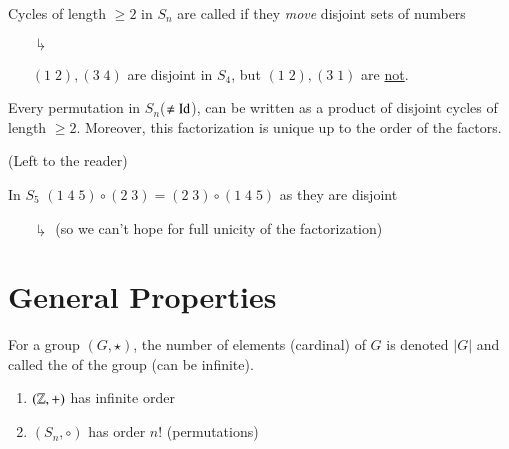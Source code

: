 \documentclass[12pt, a4paper, twoside, openright, titlepage]{book}
\begin{document}
\begin{defn}{}{}
    Cycles of length $\geq 2$ in $S_n$ are called  if they \emph{move} disjoint sets of numbers
    \begin{enumerate}
        \item[$\drsh$] \begin{eg}{}{}
            $(1\;2), (3\;4)$ are disjoint in $S_4$, but $(1\;2),(3\;1)$ are \underline{not}.
        \end{eg} 
    \end{enumerate}
\end{defn}


\begin{rmk}{}{}
    Every permutation in $S_n$($\neq \operatorname{Id}$), can be written as a product of disjoint cycles of length $\geq 2$. Moreover, this factorization is unique up to the order of the factors.
    \begin{proof*}{}{}
        (Left to the reader)
    \end{proof*}
\end{rmk}

\begin{eg}{}{}
    In $S_5$ $(1\;4\;5)\circ(2\;3) = (2\;3) \circ(1\;4\;5)$ as they are disjoint
    \begin{enumerate}
        \item[$\drsh$] (so we can't hope for full unicity of the factorization) 
    \end{enumerate}
\end{eg}


\section{\textsection General Properties}

\begin{defn}{}{}
    For a group $(G, \star)$, the number of elements (cardinal) of $G$ is denoted $|G|$ and called the  of the group (can be infinite).
\end{defn}

\begin{eg}{}{}
    \begin{enumerate}
        \item $(\mathbb Z,+)$ has infinite order
        \item $(S_n,\circ)$ has order $n!$ (permutations)
    \end{enumerate}
\end{eg}
\end{document}
